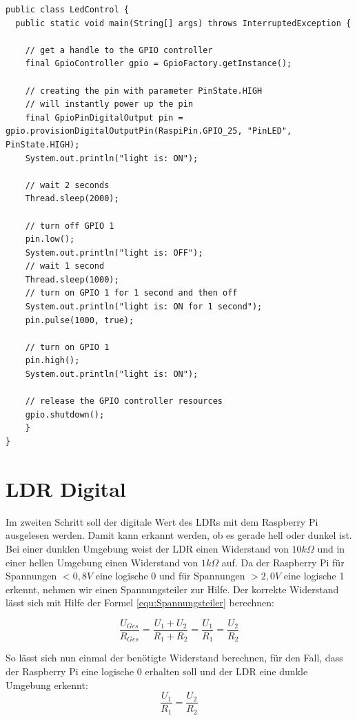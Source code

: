 \begin{lstlisting}[float=htb,caption={Ansteuerung einer LED mittels GPIO},label=code:ledcontrol]
public class LedControl {
  public static void main(String[] args) throws InterruptedException {

    // get a handle to the GPIO controller
	final GpioController gpio = GpioFactory.getInstance();

    // creating the pin with parameter PinState.HIGH
	// will instantly power up the pin
	final GpioPinDigitalOutput pin = gpio.provisionDigitalOutputPin(RaspiPin.GPIO_25, "PinLED", PinState.HIGH);
	System.out.println("light is: ON");

	// wait 2 seconds
	Thread.sleep(2000);

	// turn off GPIO 1
	pin.low();
	System.out.println("light is: OFF");
	// wait 1 second
	Thread.sleep(1000);
	// turn on GPIO 1 for 1 second and then off
	System.out.println("light is: ON for 1 second");
	pin.pulse(1000, true);

	// turn on GPIO 1
	pin.high();
	System.out.println("light is: ON");
		
	// release the GPIO controller resources
	gpio.shutdown();
	}
}
\end{lstlisting}


\section{LDR Digital}

Im zweiten Schritt soll der digitale Wert des LDRs mit dem Raspberry Pi ausgelesen werden. Damit kann erkannt werden, ob es gerade hell oder dunkel ist. Bei einer dunklen Umgebung weist der LDR einen Widerstand von  $10 k \Omega$ und in einer hellen Umgebung einen Widerstand von  $1 k \Omega$ auf. Da der Raspberry Pi für Spannungen $<0,8V$ eine logische 0 und für Spannungen $> 2,0V$ eine logische 1 erkennt, nehmen wir einen Spannungsteiler zur Hilfe. Der korrekte Widerstand lässt sich mit Hilfe der Formel \ref{equ:Spannungsteiler} berechnen:

\begin{equation}
\frac{U_{Ges}}{R_{Ges}} = \frac{U_1 + U_2}{R_1 + R_2} = \frac{U_1}{R_1} = \frac{U_2}{R_2}
\label{equ:Spannungsteiler}
\end{equation}

So lässt sich nun einmal der benötigte Widerstand berechnen, für den Fall, dass der Raspberry Pi eine logische 0 erhalten soll und der LDR eine dunkle Umgebung erkennt:
\begin{equation}
 \frac{U_1}{R_1} = \frac{U_2}{R_2}
\label{equ:vereinfacht}
\end{equation}

